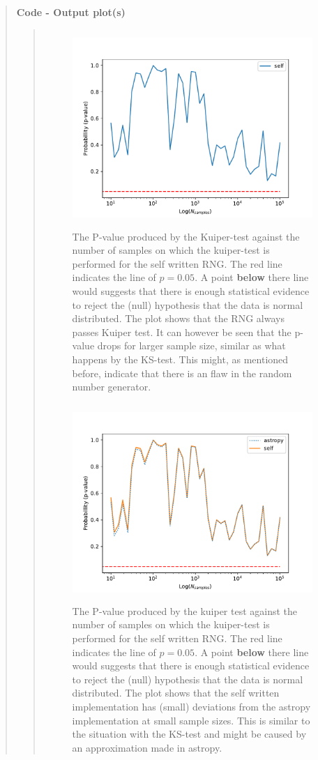 \begin{quote}
\textbf{Code - Output plot(s)}
\begin{quote}
\begin{figure}[!ht]
\centering
\includegraphics[width=12cm, height=7.5cm]{./Plots/1_plot_kuiper_test_self.pdf}
\caption{The P-value produced by the Kuiper-test against the number of samples on which the kuiper-test is performed for the self written RNG. The red line indicates the line of $ p = 0.05$. A point \textbf{below} there  line would suggests that there is enough statistical evidence to reject the (null) hypothesis that the data is normal distributed. The plot shows that the RNG always passes Kuiper test. It can however be seen that the p-value drops for larger sample size, similar as what happens by the KS-test. This might, as mentioned before, indicate that there is an flaw in the random number generator.}
\end{figure}
\newpage
\begin{figure}[!hb]
\centering
\includegraphics[width=12cm, height=7.5cm]{./Plots/1_plot_kuiper_test_self_astropy.pdf}
\caption{The P-value produced by the kuiper test against the number of samples on which the kuiper-test is performed for the self written RNG. The red line indicates the line of $ p = 0.05$. A point \textbf{below} there  line would suggests that there is enough statistical evidence to reject the (null) hypothesis that the data is normal distributed. The plot shows that the self written implementation has (small) deviations from the astropy implementation at small sample sizes. This is similar to the situation with the KS-test and might be caused by an approximation made in astropy.   }
\end{figure}

\end{quote}
\end{quote}














